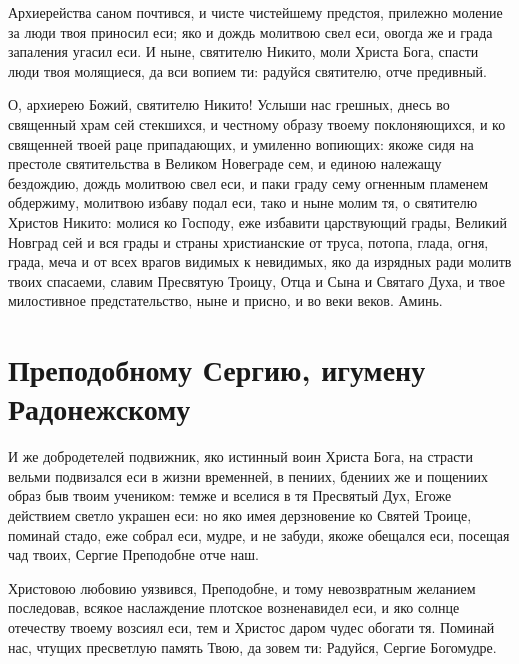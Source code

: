 Архиерейства саном почтився, и чисте чистейшему предстоя, прилежно моление за люди твоя приносил еси; яко и дождь молитвою свел еси, овогда же и града запаления угасил еси. И ныне, святителю Никито, моли Христа Бога, спасти люди твоя молящиеся, да вси вопием ти: радуйся святителю, отче предивный.




О, архиерею Божий, святителю Никито! Услыши нас грешных, днесь во священный храм сей стекшихся, и честному образу твоему поклоняющихся, и ко священней твоей раце припадающих, и умиленно вопиющих: якоже сидя на престоле святительства в Великом Новеграде сем, и единою належащу бездождию, дождь молитвою свел еси, и паки граду сему огненным пламенем обдержиму, молитвою избаву подал еси, тако и ныне молим тя, о святителю Христов Никито: молися ко Господу, еже избавити царствующий грады, Великий Новград сей и вся грады и страны христианские от труса, потопа, глада, огня, града, меча и от всех врагов видимых к невидимых, яко да изрядных ради молитв твоих спасаеми, славим Пресвятую Троицу, Отца и Сына и Святаго Духа, и твое милостивное предстательство, ныне и присно, и во веки веков. Аминь.


\newpage\section{Преподобному Сергию, игумену Радонежскому}
 



И же добродетелей подвижник, яко истинный воин Христа Бога, на страсти вельми подвизался еси в жизни временней, в пениих, бдениих же и пощениих образ быв твоим учеником: темже и вселися в тя Пресвятый Дух, Егоже действием светло украшен еси: но яко имея дерзновение ко Святей Троице, поминай стадо, еже собрал еси, мудре, и не забуди, якоже обещался еси, посещая чад твоих, Сергие Преподобне отче наш.




Христовою любовию уязвився, Преподобне, и тому невозвратным желанием последовав, всякое наслаждение плотское возненавидел еси, и яко солнце отечеству твоему возсиял еси, тем и Христос даром чудес обогати тя. Поминай нас, чтущих пресветлую память Твою, да зовем ти: Радуйся, Сергие Богомудре.





